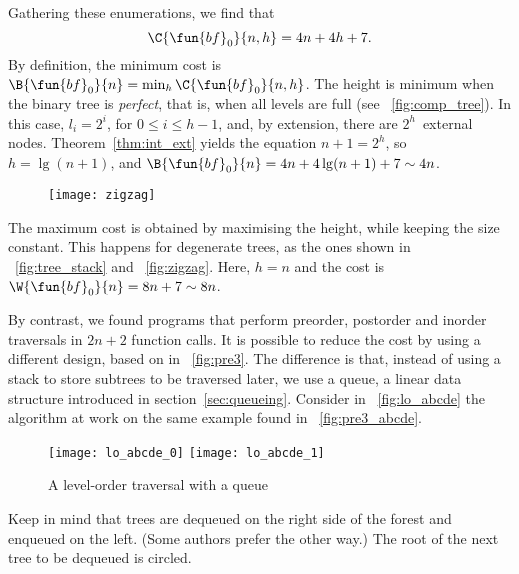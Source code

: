 Gathering these enumerations, we find that
\begin{equation*}
\C{\fun{bf}_0}{n,h} = 4n + 4h + 7. \index{bf0@$\C{\fun{bf}_0}{n,h}$}
\end{equation*}
By definition, the minimum cost is \(\B{\fun{bf}_0}{n} =
\min_h\C{\fun{bf}_0}{n,h}\). The height is
minimum when the binary tree is \emph{perfect}, that is, when all levels are full (see
\fig~\vref{fig:comp_tree}). In this case, \(l_i=2^i\), for \(0
\leqslant i \leqslant h-1\), and, by extension, there are
\(2^h\)~external nodes. Theorem~\vref{thm:int_ext} yields the equation
\(n+1 = 2^h\), so \(h=\lg(n+1)\), and \(\B{\fun{bf}_0}{n} = 4n +
4\lg(n+1) + 7 \sim 4n\). 

%
\begin{wrapfigure}[7]{r}[0pt]{0pt}
\centering
\texttt{[image: zigzag]}
\caption{}
\label{fig:zigzag}
\end{wrapfigure}
The maximum cost is obtained by maximising the height, while keeping the size constant. This happens for
degenerate  trees, as the ones
shown in \fig~\vref{fig:tree_stack} and \fig~\vref{fig:zigzag}. Here,
\(h=n\) and the cost is \(\W{\fun{bf}_0}{n} = 8n + 7 \sim
8n\). 

By contrast, we found programs that perform preorder, postorder and
inorder traversals in \(2n+2\) function calls. It is possible to
reduce the cost by using a different design, based on
 in
\fig~\vref{fig:pre3}. The difference is that, instead of using a stack
to store subtrees to be traversed later, we use a queue,
a linear data structure introduced in
section~\ref{sec:queueing}. Consider in \fig~\vref{fig:lo_abcde} the
algorithm at work on the same example found in
\fig~\vref{fig:pre3_abcde}.
\begin{figure}[b]
\centering
\texttt{[image: lo\_abcde\_0]}
\bigskip
\texttt{[image: lo\_abcde\_1]}
\caption{A level-order traversal with a queue}
\label{fig:lo_abcde}
\end{figure}
Keep in mind that trees are dequeued on the right side of the forest
and enqueued on the left. (Some authors prefer the other way.) The
root of the next tree to be dequeued is circled.

